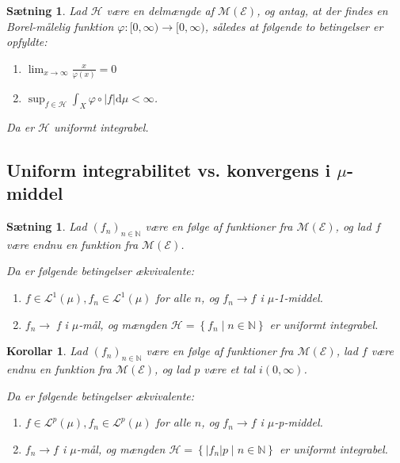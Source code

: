 \documentclass{article}
\newcommand{\1}{\mathbbm{1}}
\newtheorem{corollary}[theorem]{Korollar}
\newtheorem{proposition}[theorem]{Sætning}
\theoremstyle{boxed}
\begin{document}
\begin{theorem-box}
    \begin{proposition}
        Lad $\mathcal{H}$ være en delmængde af $\mathcal{M}(\mathcal{E})$, og antag, at der findes en Borel-målelig funktion $\varphi:[0, \infty) \rightarrow[0, \infty)$, således at følgende to betingelser er opfyldte:
        \begin{enumerate}
            \item[\textnormal{(i)}] $\lim _{x \rightarrow \infty} \frac{x}{\varphi(x)}=0$
            \item[\textnormal{(ii)}] $\sup _{f \in \mathcal{H}} \int_X \varphi \circ|f| \mathrm{d} \mu<\infty$.
        \end{enumerate}
Da er $\mathcal{H}$ uniformt integrabel.
    \end{proposition}
\end{theorem-box}
\subsection{Uniform integrabilitet vs. konvergens i $\mu$-middel}
\begin{theorem-box}
    \begin{proposition}
        Lad $\left(f_n\right)_{n \in \mathbb{N}}$ være en følge af funktioner fra $\mathcal{M}(\mathcal{E})$, og lad $f$ være endnu en funktion fra $\mathcal{M}(\mathcal{E})$.

Da er følgende betingelser ækvivalente:
\begin{enumerate}
    \item[\textnormal{(i)}] $f \in \mathcal{L}^1(\mu), f_n \in \mathcal{L}^1(\mu)$ for alle $n$, og $f_n \rightarrow f$ i $\mu$-1-middel.
    \item[\textnormal{(ii)}] $f_n \rightarrow$ f i $\mu$-mål, og mængden $\mathcal{H}=\left\{f_n \mid n \in \mathbb{N}\right\}$ er uniformt integrabel.
\end{enumerate}
    \end{proposition}
\end{theorem-box}
\begin{theorem-box}
    \begin{corollary}
        Lad $\left(f_n\right)_{n \in \mathbb{N}}$ være en følge af funktioner fra $\mathcal{M}(\mathcal{E})$, lad $f$ være endnu en funktion fra $\mathcal{M}(\mathcal{E})$, og lad $p$ være et tal $i(0, \infty)$.

Da er følgende betingelser ækvivalente:
\begin{enumerate}
    \item[\textnormal{(i$_p$)}] $f \in \mathcal{L}^p(\mu), f_n \in \mathcal{L}^p(\mu)$ for alle $n$, og $f_n \rightarrow f$ i $\mu$-p-middel.
    \item[\textnormal{(ii$_p$)}] $f_n \rightarrow f$ i $\mu$-mål, og mængden $\mathcal{H}=\left\{\left|f_n\right| p \mid n \in \mathbb{N}\right\}$ er uniformt integrabel.
\end{enumerate}
    \end{corollary}
\end{theorem-box}
\end{document}
